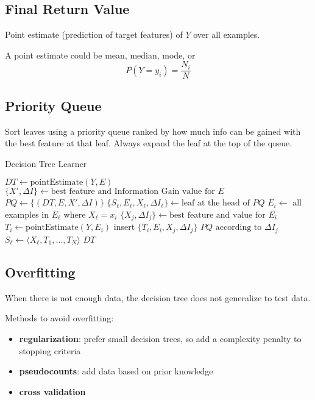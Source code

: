 \documentclass[11pt]{article}
\begin{document}
\subsection{Final Return Value}
\label{sec:orgc3fe50c}
Point estimate (prediction of target features) of \(Y\) over all examples.

A point estimate could be mean, median, mode, or
$$
P(Y = y_{i}) = \frac{N_{i}}{N}
$$
\subsection{Priority Queue}
\label{sec:org5c1dab0}
Sort leaves using a priority queue ranked by how much info can be gained with the best feature at that
leaf.
Always expand the leaf at the top of the queue.

\begin{algorithm}
\caption{Decision Tree Learner}
\begin{algorithmic}[1]
    \State \( DT \gets \text{pointEstimate}(Y, E) \) 
    \State \( \{ X', \Delta I \} \gets \text{best feature and Information Gain value for } E \)
    \State \( PQ \gets \{ (DT, E, X', \Delta I) \} \) 
        \State \( \{ S_\ell, E_\ell, X_\ell, \Delta I_\ell \} \gets \text{leaf at the head of } PQ \)
            \State \( E_i \gets \) all examples in \( E_\ell \) where \( X_\ell = x_i \)
            \State \( \{ X_j, \Delta I_j \} \gets \text{best feature and value for } E_i \)
            \State \( T_i \gets \text{pointEstimate}(Y, E_i) \)
            \State insert \( \{ T_i, E_i, X_j, \Delta I_j \} \)  \( PQ \text{ according to } \Delta I_j \)
        \EndFor
        \State \( S_\ell \gets \langle X_\ell, T_1, \ldots, T_N \rangle \)
    \EndWhile
    \State \Return \( DT \)
\EndProcedure
\end{algorithmic}
\end{algorithm}
\subsection{Overfitting}
\label{sec:org3dece28}
When there is not enough data, the decision tree does not generalize to test data.

Methods to avoid overfitting:
\begin{itemize}
\item \textbf{regularization}: prefer small decision trees, so add a complexity penalty to stopping criteria
\item \textbf{pseudocounts}: add data based on prior knowledge
\item \textbf{cross validation}
\end{itemize}
\end{document}
